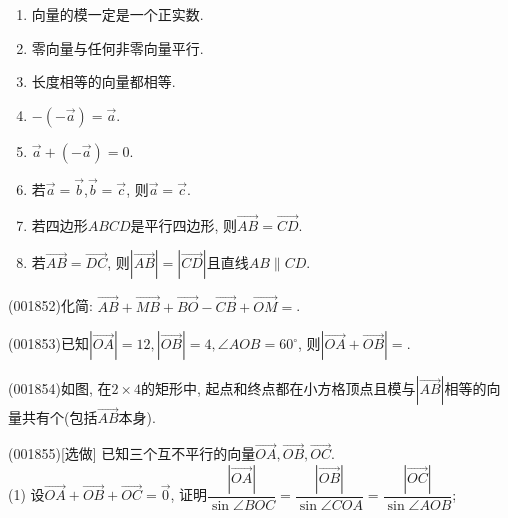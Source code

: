 \begin{enumerate}[\blank{30}(1)]
\item 向量的模一定是一个正实数.\\ 
\item 零向量与任何非零向量平行.\\ 
\item 长度相等的向量都相等.\\ 
\item $-(-\overrightarrow{a})=\overrightarrow{a}$.\\ 
\item $\overrightarrow{a}+(-\overrightarrow{a})=0$.\\ 
\item 若$\overrightarrow{a}=\overrightarrow{b}$,$\overrightarrow{b}=\overrightarrow{c}$, 则$\overrightarrow{a}=\overrightarrow{c}$.\\ 
\item 若四边形$ABCD$是平行四边形, 则$\overrightarrow{AB}=\overrightarrow{CD}$.\\ 
\item 若$\overrightarrow{AB}=\overrightarrow{DC}$, 则$|\overrightarrow{AB}|=|\overrightarrow{CD}|$且直线$AB\parallel CD$.\\ 
\end{enumerate}
\item (001852)化简: $\overrightarrow{AB}+\overrightarrow{MB}+\overrightarrow{BO}-\overrightarrow{CB}+\overrightarrow{OM}=$.
\item (001853)已知$|\overrightarrow{OA}|=12,|\overrightarrow{OB}|=4,\angle AOB=60^\circ$, 则$|\overrightarrow{OA}+\overrightarrow{OB}|=$.
\item (001854)如图, 在$2\times 4$的矩形中, 起点和终点都在小方格顶点且模与$|\overrightarrow{AB}|$相等的向量共有个(包括$\overrightarrow{AB}$本身).
\begin{center}
\end{center}
\item (001855)[选做]
已知三个互不平行的向量$\overrightarrow{OA},\overrightarrow{OB},\overrightarrow{OC}$.\\ 
(1) 设$\overrightarrow{OA}+\overrightarrow{OB}+\overrightarrow{OC}=\overrightarrow{0}$, 证明$\dfrac{|\overrightarrow{OA}|}{\sin\angle BOC}=\dfrac{|\overrightarrow{OB}|}{\sin\angle COA}=\dfrac{|\overrightarrow{OC}|}{\sin\angle AOB}$;\\ 
